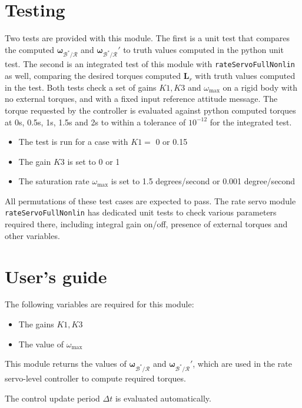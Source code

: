 \documentclass[]{BasiliskReportMemo}
\begin{document}
\section{Testing}
Two tests are provided with this module. The first is a unit test that compares the computed $\bm\omega_{\mathcal{B}^{\ast}/\mathcal{R}} $ and $\bm\omega_{\mathcal{B}^{\ast}/\mathcal{R}}' $ to truth values computed in the python unit test. The second is an integrated test of this module with \verb|rateServoFullNonlin| as well, comparing the desired torques computed $\bm L_r$ with truth values computed in the test. 
Both tests check a set of gains $K1,K3$ and $\omega_{\text{max}}$ on a rigid body with no external torques, and with a fixed input reference attitude message. The torque requested by the controller is evaluated against python computed torques at 0s, 0.5s, 1s, 1.5s and 2s to within a tolerance of $10^{-12}$ for the integrated test. 
\begin{itemize}
	\item The test is run for a case with $K1 =$ 0 or 0.15
	\item The gain $K3$ is set to 0 or 1
	\item The saturation rate $\omega_\text{max}$ is set to 1.5 degrees/second or 0.001 degree/second
\end{itemize}
All permutations of these test cases are expected to pass.
The rate servo module  \verb|rateServoFullNonlin| has dedicated unit tests to check various parameters required there, including integral gain on/off, presence of external torques and other variables.

\section{User's guide}
The following variables are required for this module:
\begin{itemize}
\item The gains $K1, K3$
\item The value of $\omega_\text{max}$
\end{itemize}
This module returns the values of $\bm\omega_{\mathcal{B}^{\ast}/\mathcal{R}} $ and $\bm\omega_{\mathcal{B}^{\ast}/\mathcal{R}}' $, which are used in the rate servo-level controller to compute required torques.

The control update period $\Delta t$ is evaluated automatically.  


\end{document}
